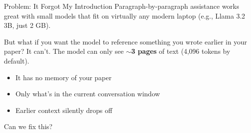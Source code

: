 \documentclass[aspectratio=169]{beamer}
\begin{document}
\begin{frame}{Problem: It Forgot My Introduction}
    Paragraph-by-paragraph assistance works great with small models that fit on virtually any modern laptop (e.g., Llama 3.2 3B, just 2 GB).

    \vspace{0.8em}
    But what if you want the model to reference something you wrote earlier in your paper? It can't. The model can only see $\sim$\textbf{3 pages} of text (4,096 tokens by default).

    \vspace{0.5em}
    \begin{itemize}
        \vspace{0.3em}
        \item It has no memory of your paper
        \vspace{0.3em}
        \item Only what's in the current conversation window
        \vspace{0.3em}
        \item Earlier context silently drops off
    \end{itemize}

    \vspace{1em}
    Can we fix this?
\end{frame}

\end{document}
